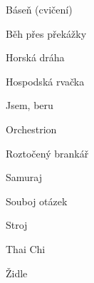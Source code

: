 \documentclass[main.tex]{subfiles}
\begin{document}
\large{Báseň (cvičení)}

\large{Běh přes překážky}

\large{Horská dráha}

\large{Hospodská rvačka}

\large{Jsem, beru}

\large{Orchestrion}

\large{Roztočený brankář}

\large{Samuraj}

\large{Souboj otázek}

\large{Stroj}

\large{Thai Chi}

\large{Židle}
\end{document}
